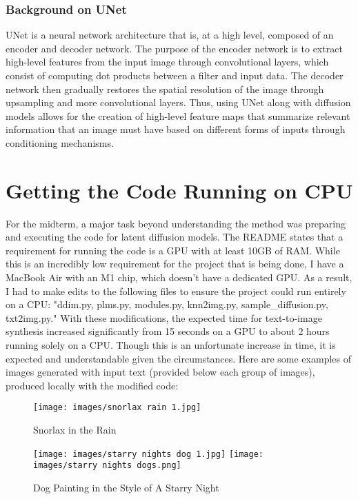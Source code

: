 \documentclass{article}
\begin{document}
\subsubsection{Background on UNet}
UNet is a neural network architecture that is, at a high level, composed of an encoder and decoder network. The purpose of the encoder network is to extract high-level features from the input image through convolutional layers, which consist of computing dot products between a filter and input data. The decoder network then gradually restores the spatial resolution of the image through upsampling and more convolutional layers. Thus, using UNet along with diffusion models allows for the creation of high-level feature maps that summarize relevant information that an image must have based on different forms of inputs through conditioning mechanisms.

\section{Getting the Code Running on CPU}

For the midterm, a major task beyond understanding the method was preparing and executing the code for latent diffusion models. The README states that a requirement for running the code is a GPU with at least 10GB of RAM. While this is an incredibly low requirement for the project that is being done, I have a MacBook Air with an M1 chip, which doesn't have a dedicated GPU. As a result, I had to make edits to the following files to ensure the project could run entirely on a CPU: "ddim.py, plms.py, modules.py, knn2img.py, sample\_diffusion.py, txt2img.py." With these modifications, the expected time for text-to-image synthesis increased significantly from 15 seconds on a GPU to about 2 hours running solely on a CPU. Though this is an unfortunate increase in time, it is expected and understandable given the circumstances. Here are some examples of images generated with input text (provided below each group of images), produced locally with the modified code:


\begin{figure}[h!]
\begin{center}
  \texttt{[image: images/snorlax rain 1.jpg]}
\end{center}
  \caption{Snorlax in the Rain}
  \label{fig:snorlax rain}
\end{figure}

\begin{figure}[h!]
\begin{center}
  \texttt{[image: images/starry nights dog 1.jpg]}
  \texttt{[image: images/starry nights dogs.png]}
\end{center}
  \caption{Dog Painting in the Style of A Starry Night}
  \label{fig:dog starry night}
\end{figure}
\end{document}

